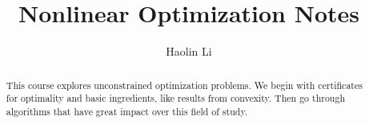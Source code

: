 \documentclass[a4paper]{report}
\author{Haolin Li}
\title{Nonlinear Optimization Notes}
\begin{document}
\maketitle

\begin{abstract}
	This course explores unconstrained optimization problems. We begin with certificates for optimality and basic ingredients, like results from convexity. Then go through algorithms that have great impact over this field of study. 
\end{abstract}

\newpage

\tableofcontents




\newpage

\newpage
\printbibliography
\end{document}
